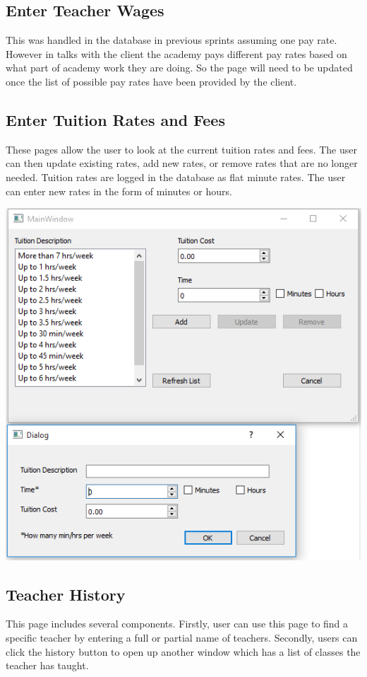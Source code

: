 \subsection{Enter Teacher Wages}
This was handled in the database in previous sprints assuming one pay rate. However in talks with the client the academy pays different pay rates based on what part of academy work they are doing. So the page will need to be updated once the list of possible pay rates have been provided by the client.

\subsection{Enter Tuition Rates and Fees}
These pages allow the user to look at the current tuition rates and fees. The user can then update existing rates, add new rates, or remove rates that are no longer needed. Tuition rates are logged in the database as flat minute rates. The user can enter new rates in the form of minutes or hours.

\includegraphics[scale=0.5]{tuitionRates.png}

\subsection{Teacher History}
This page includes several components. Firstly, user can use this page to find a specific teacher by entering a full or partial name of teachers. Secondly, users can click the history button to open up another window which has a list of classes the teacher has taught.\\

